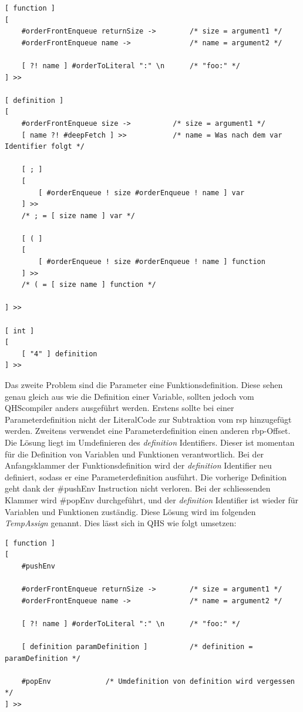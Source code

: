 \begin{minipage}{\linewidth}
\begin{lstlisting}[language=QHS, caption=Implementation eines DelayedExecute für Definitionen]
[ function ]
[
    #orderFrontEnqueue returnSize ->        /* size = argument1 */
    #orderFrontEnqueue name ->              /* name = argument2 */

    [ ?! name ] #orderToLiteral ":" \n      /* "foo:" */
] >>

[ definition ]
[
    #orderFrontEnqueue size ->          /* size = argument1 */
    [ name ?! #deepFetch ] >>           /* name = Was nach dem var Identifier folgt */

    [ ; ]
    [
        [ #orderEnqueue ! size #orderEnqueue ! name ] var 
    ] >>
    /* ; = [ size name ] var */

    [ ( ]
    [
        [ #orderEnqueue ! size #orderEnqueue ! name ] function 
    ] >>
    /* ( = [ size name ] function */

] >>

[ int ]
[
    [ "4" ] definition
] >>
\end{lstlisting}
\end{minipage}


Das zweite Problem sind die Parameter eine Funktionsdefinition. Diese sehen genau gleich aus wie die Definition einer Variable, sollten jedoch vom QHScompiler anders ausgeführt werden.
Erstens sollte bei einer Parameterdefinition nicht der LiteralCode zur Subtraktion vom rsp hinzugefügt werden. Zweitens verwendet eine Parameterdefinition einen anderen rbp-Offset.
Die Lösung liegt im Umdefinieren des \textit{definition} Identifiers. Dieser ist momentan für die Definition von Variablen und Funktionen verantwortlich.
Bei der Anfangsklammer der Funktionsdefinition wird der \textit{definition} Identifier neu definiert, sodass er eine Parameterdefinition ausführt. Die vorherige Definition geht dank der \#pushEnv Instruction nicht verloren.
Bei der schliessenden Klammer wird \#popEnv durchgeführt, und der \textit{definition} Identifier ist wieder für Variablen und Funktionen zuständig. Diese Lösung wird im folgenden \textit{TempAssign} genannt.
Dies lässt sich in QHS wie folgt umsetzen:

\begin{minipage}{\linewidth}
\begin{lstlisting}[language=QHS, caption=Implementation eines TempAssigns für Parameter Definitionen]
[ function ]
[
    #pushEnv

    #orderFrontEnqueue returnSize ->        /* size = argument1 */
    #orderFrontEnqueue name ->              /* name = argument2 */

    [ ?! name ] #orderToLiteral ":" \n      /* "foo:" */

    [ definition paramDefinition ]          /* definition = paramDefinition */

    #popEnv             /* Umdefinition von definition wird vergessen */
] >>
\end{lstlisting}
\end{minipage}

